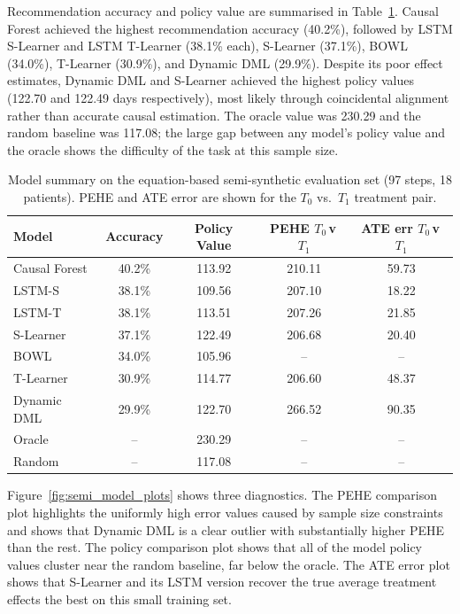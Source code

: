 \documentclass{article}
\begin{document}
Recommendation accuracy and policy value are summarised in
Table~\ref{tab:semi_model_summary}. Causal Forest achieved the highest
recommendation accuracy (40.2\%), followed by LSTM S-Learner and LSTM T-Learner (38.1\%
each), S-Learner (37.1\%), BOWL (34.0\%), T-Learner (30.9\%), and
Dynamic DML (29.9\%). Despite its poor effect estimates, Dynamic DML and
S-Learner achieved the highest policy values (122.70 and 122.49 days
respectively), most likely through coincidental alignment rather than accurate
causal estimation. The oracle value was 230.29 and the random baseline
was 117.08; the large gap between any model's policy value and the oracle
shows the difficulty of the task at this sample size.

\begin{table}[H]
    \centering
    \begin{tabular}{lcccc}
        \toprule
        \textbf{Model} & \textbf{Accuracy} & \textbf{Policy Value} & \textbf{PEHE $T_0$\,v\,$T_1$} & \textbf{ATE err $T_0$\,v\,$T_1$} \\
        \midrule
        Causal Forest & 40.2\% & 113.92 & 210.11 & 59.73 \\
        LSTM-S        & 38.1\% & 109.56 & 207.10 & 18.22 \\
        LSTM-T        & 38.1\% & 113.51 & 207.26 & 21.85 \\
        S-Learner     & 37.1\% & 122.49 & 206.68 & 20.40 \\
        BOWL          & 34.0\% & 105.96 & --     & --    \\
        T-Learner     & 30.9\% & 114.77 & 206.60 & 48.37 \\
        Dynamic DML   & 29.9\% & 122.70 & 266.52 & 90.35 \\
        \midrule
        Oracle        & --      & 230.29 & --     & --    \\
        Random        & --      & 117.08 & --     & --    \\
        \bottomrule
    \end{tabular}
    \caption{Model summary on the equation-based semi-synthetic evaluation set (97 steps, 18 patients). PEHE and ATE error are shown for the $T_0$ vs.\ $T_1$ treatment pair.}
    \label{tab:semi_model_summary}
\end{table}

Figure~\ref{fig:semi_model_plots} shows three diagnostics.
The PEHE comparison plot highlights the uniformly high error values
caused by sample size constraints and shows that Dynamic DML is a clear
outlier with substantially higher PEHE than the rest. The policy comparison plot
shows that all of the model policy values cluster near the random
baseline, far below the oracle. The ATE error plot shows that
S-Learner and its LSTM version recover the true average treatment effects the best on
this small training set.
\end{document}
